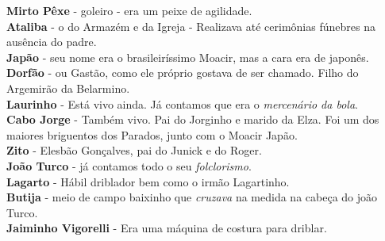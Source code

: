 \documentclass[12pt,brazil,]{book}
\begin{document}
\textbf{Mirto Pêxe} - goleiro - era um peixe de agilidade.\\
\textbf{Ataliba} - o do Armazém e da Igreja - Realizava até cerimônias
fúnebres na ausência do padre.\\
\textbf{Japão} - seu nome era o brasileiríssimo Moacir, mas a cara era
de japonês.\\
\textbf{Dorfão} - ou Gastão, como ele próprio gostava de ser chamado.
Filho do Argemirão da Belarmino.\\
\textbf{Laurinho} - Está vivo ainda. Já contamos que era o
\emph{mercenário da bola}.\\
\textbf{Cabo Jorge} - Também vivo. Pai do Jorginho e marido da Elza. Foi
um dos maiores briguentos dos Parados, junto com o Moacir Japão.\\
\textbf{Zito} - Elesbão Gonçalves, pai do Junick e do Roger.\\
\textbf{João Turco} - já contamos todo o seu \emph{folclorismo}.\\
\textbf{Lagarto} - Hábil driblador bem como o irmão Lagartinho.\\
\textbf{Butija} - meio de campo baixinho que \emph{cruzava} na medida na
cabeça do joão Turco.\\
\textbf{Jaiminho Vigorelli} - Era uma máquina de costura para driblar.
\end{document}
